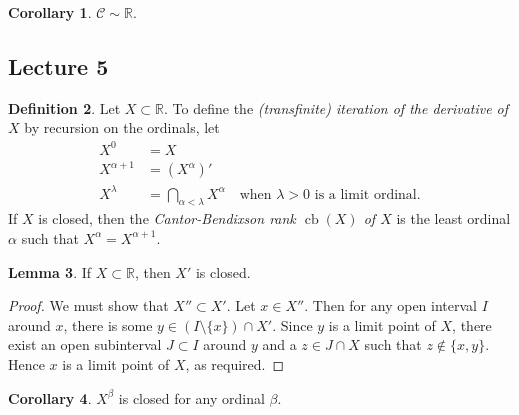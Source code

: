 \documentclass[10pt,letterpaper,cm]{nupset}
\theoremstyle{definition}
\newtheorem{definition}{Definition}[subsection]
\theoremstyle{theorem}
\newtheorem{lemma}[definition]{Lemma}
\newtheorem{corollary}[definition]{Corollary}
\theoremstyle{remark}
\newcommand{\R}{\mathbb R}
\newcommand{\1}{\mathbf{1}}
\newcommand{\0}{\vec 0}
\DeclareMathOperator{\cb}{cb}
\begin{document}
\begin{corollary}
$\bm{\mathcal{C}} \sim \R$.
\end{corollary}

\subsection{Lecture 5}

\begin{definition}
Let $X\subset \R$. To define the \textit{(transfinite) iteration of the derivative of $X$} by recursion on the ordinals, let
\begin{align*}
X^0 & = X
\\ X^{\alpha +1} & =  (X^{\alpha})'
\\ X^{\lambda} & = \bigcap_{\alpha < \lambda} X^{\alpha} \quad \text{when } \lambda >0 \text{ is a limit ordinal}.
\end{align*} 
If $X$ is closed, then the \textit{Cantor-Bendixson rank $\cb(X)$ of $X$} is the least ordinal $\alpha$ such that $X^{\alpha} = X^{\alpha +1}$.
\end{definition}

\begin{lemma}\label{closed}
If $X\subset \R$, then $X'$ is closed. 
\end{lemma}
\begin{proof}
We must show that $X'' \subset X'$. Let $x\in X''$. Then for any open interval $I$ around $x$, there is some $y \in (I \setminus \{x\}) \cap X'$. Since $y$ is a limit point of $X$, there exist an open subinterval $J \subset I$ around $y$ and a $z \in J \cap X$  such that $z\notin \{x,y\}$. Hence $x$ is a limit point of $X$, as required. 
\end{proof}

\begin{corollary}
$X^{\beta}$ is closed for any ordinal $\beta$.
\end{corollary}
\end{document}
